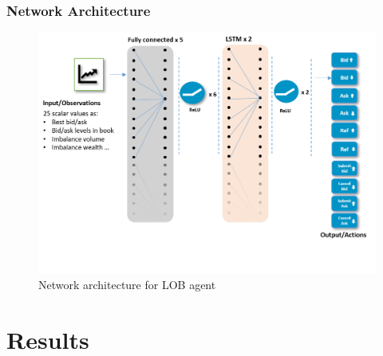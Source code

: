 \documentclass[aspectratio=1610]{beamer}
\begin{document}
\begin{frame}
  \frametitle{\hfill Network Architecture}

  \begin{block}{}
    \begin{figure}[H]
    \centering
    \includegraphics[scale=.40]{nnalob1.png}
    \caption{Network architecture for LOB agent}
    \label{fig:5}
\end{figure}
  \end{block}

\end{frame}



\section{Results}
\end{document}
